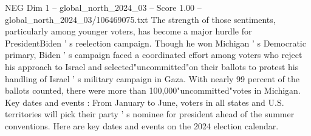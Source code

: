 \begin{textsample}{NEG Dim 1 – global\_north\_2024\_03 – Score 1.00 – global\_north\_2024\_03/106469075.txt}
The strength of those sentiments, particularly among younger voters, has become a major hurdle for PresidentBiden ' s reelection campaign.
Though he won Michigan ' s Democratic primary, Biden ' s campaign faced a coordinated effort among voters who reject his approach to Israel and selected"uncommitted"on their ballots to protest his handling of Israel ' s military campaign in Gaza.
With nearly 99 percent of the ballots counted, there were more than 100,000"uncommitted"votes in Michigan.
Key dates and events : From January to June, voters in all states and U.S. territories will pick their party ' s nominee for president ahead of the summer conventions.
Here are key dates and events on the 2024 election calendar.

\end{textsample}
